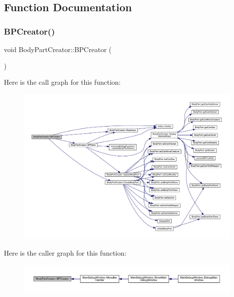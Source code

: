 \subsection{Function Documentation}
\mbox{\label{namespace_body_part_creator_aa69c6643c5e96d7dee3884662bb6ca00}} 
\subsubsection{\texorpdfstring{B\+P\+Creator()}{BPCreator()}}
{\footnotesize\ttfamily void Body\+Part\+Creator\+::\+B\+P\+Creator (\begin{DoxyParamCaption}{ }\end{DoxyParamCaption})}

Here is the call graph for this function\+:
\nopagebreak
\begin{figure}[H]
\begin{center}
\leavevmode
\includegraphics[width=350pt]{d8/d3a/namespace_body_part_creator_aa69c6643c5e96d7dee3884662bb6ca00_cgraph}
\end{center}
\end{figure}
Here is the caller graph for this function\+:
\nopagebreak
\begin{figure}[H]
\begin{center}
\leavevmode
\includegraphics[width=350pt]{d8/d3a/namespace_body_part_creator_aa69c6643c5e96d7dee3884662bb6ca00_icgraph}
\end{center}
\end{figure}
\mbox{\label{namespace_body_part_creator_ac18c9ae3935b336efbb9634fb329413f}} 
